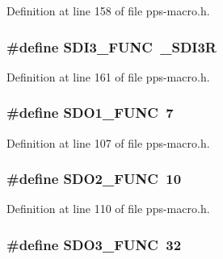 Definition at line 158 of file pps-\/macro.\+h.

\hypertarget{pps-macro_8h_ac16de750ed182c5973d9b82412e8ff38}{}
\subsubsection[{S\+D\+I3\+\_\+\+F\+U\+N\+C}]{\setlength{\rightskip}{0pt plus 5cm}\#define S\+D\+I3\+\_\+\+F\+U\+N\+C~\+\_\+\+S\+D\+I3\+R}\label{pps-macro_8h_ac16de750ed182c5973d9b82412e8ff38}


Definition at line 161 of file pps-\/macro.\+h.

\hypertarget{pps-macro_8h_a10d9a7902717b270c1d262571bf2f6a4}{}
\subsubsection[{S\+D\+O1\+\_\+\+F\+U\+N\+C}]{\setlength{\rightskip}{0pt plus 5cm}\#define S\+D\+O1\+\_\+\+F\+U\+N\+C~7}\label{pps-macro_8h_a10d9a7902717b270c1d262571bf2f6a4}


Definition at line 107 of file pps-\/macro.\+h.

\hypertarget{pps-macro_8h_a3826500c905f7ace212b6684dcef38d2}{}
\subsubsection[{S\+D\+O2\+\_\+\+F\+U\+N\+C}]{\setlength{\rightskip}{0pt plus 5cm}\#define S\+D\+O2\+\_\+\+F\+U\+N\+C~10}\label{pps-macro_8h_a3826500c905f7ace212b6684dcef38d2}


Definition at line 110 of file pps-\/macro.\+h.

\hypertarget{pps-macro_8h_a5ff886f3a58dc672830f10744775c2b8}{}
\subsubsection[{S\+D\+O3\+\_\+\+F\+U\+N\+C}]{\setlength{\rightskip}{0pt plus 5cm}\#define S\+D\+O3\+\_\+\+F\+U\+N\+C~32}\label{pps-macro_8h_a5ff886f3a58dc672830f10744775c2b8}


